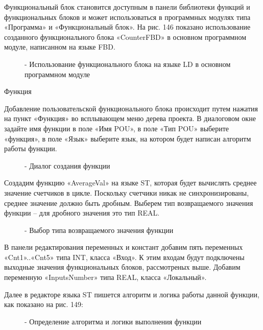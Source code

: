\documentclass[letterpaper,10pt,russian]{sphinxmanual}
\begin{document}
Функциональный блок становится доступным в панели библиотеки функций и
функциональных блоков и может использоваться в программных
модулях типа «Программа» и «Функциональный блок». На рис. 146 показано
использование созданного функционального блока «CounterFBD» в основном
программном модуле, написанном на языке FBD.
\begin{figure}[htbp]
\centering
\capstart

\noindent{}
\caption{- Использование функционального блока на языке LD в основном программном модуле}\label{usage_guide/work_with_project:image189}\end{figure}

Функция

Добавление пользовательской функционального блока происходит путем
нажатия на пункт «Функция» во всплывающем меню дерева проекта.
В диалоговом окне задайте имя функции в поле
«Имя POU», в поле «Тип POU» выберите «функция», в поле «Язык» выберите
язык, на котором будет написан алгоритм работы функции.
\begin{figure}[htbp]
\centering
\capstart

\noindent{}
\caption{- Диалог создания функции}\label{usage_guide/work_with_project:image190}\end{figure}

Создадим функцию «AverageVal» на языке ST, которая будет вычислять
среднее значение счетчиков в цикле. Поскольку счетчики никак не
синхронизированы, среднее значение должно быть дробным. Выберем тип
возвращаемого значения функции – для дробного значения это тип REAL.
\begin{figure}[htbp]
\centering
\capstart

\noindent{}
\caption{- Выбор типа возвращаемого значения функции}\label{usage_guide/work_with_project:image191}\end{figure}

В панели редактирования переменных и констант добавим пять переменных
«Cnt1»..«Cnt5» типа INT, класса «Вход». К этим входам будут подключены
выходные значения функциональных блоков, рассмотреных выше.
Добавим переменную «InputsNumber» типа REAL, класса «Локальный».

Далее в редакторе языка ST пишется алгоритм и логика работы данной
функции, как показано на рис. 149:
\begin{figure}[htbp]
\centering
\capstart

\noindent{}
\caption{- Определение алгоритма и логики выполнения функции}\label{usage_guide/work_with_project:image192}\end{figure}
\end{document}
